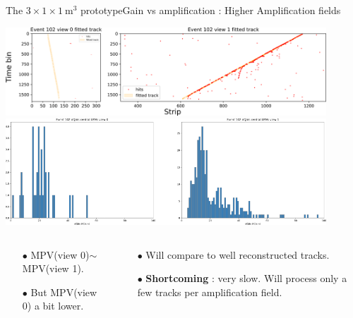 \documentclass[10pt]{beamer}
\begin{document}
    \begin{frame}{The \texorpdfstring{$3 \times 1 \times \SI{1}{\meter\cubed}$}{311} prototype}{Gain vs amplification : Higher Amplification fields}
    	\begin{scriptsize}
    		\centering
    		\includegraphics[width=0.9\textwidth]{figures/311/rawdatasoft_track.png}\\
    		\includegraphics[width=0.9\textwidth]{figures/311/rawdatasoft_dQds.png}\\
    		\vfill
    		\begin{columns}
    			\begin{column}{0.5\textwidth}
    				\begin{itemize}
    					\item[$\bullet$] MPV(view 0)$\sim$MPV(view 1).
    					\item[$\bullet$] But MPV(view 0) a bit lower.
    				\end{itemize}
    			\end{column}
    			\hfill
    			\begin{column}{0.5\textwidth}
    				\begin{itemize}
    					\item[$\bullet$] Will compare to well reconstructed tracks.
    					\item[$\bullet$] \textbf{Shortcoming} : very slow. Will process only a few tracks per amplification field.
    				\end{itemize}
    			\end{column}
    		\end{columns}
    	\end{scriptsize}
    \end{frame}
    
\end{document}
